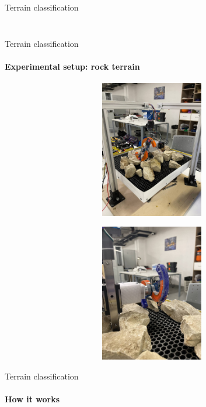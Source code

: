 \documentclass[aspectratio=169]{beamer}
\begin{document}
\begin{frame}[t]{Terrain classification}
\begin{columns}[T,onlytextwidth]
\begin{column}{0.49\textwidth}
\begin{figure}[H]
\begin{subfigure}{\textwidth}
                \end{subfigure}
            \end{figure}
        \end{column}
    \end{columns}
\end{frame}


\begin{frame}[t]{Terrain classification}
    \framesubtitle{Experimental setup: rock terrain}
    \vspace{-15pt}
    \begin{figure}[H]
        \begin{subfigure}{0.49\textwidth}
            \centering\includegraphics[height=6cm,width=1\textwidth,keepaspectratio]{s_shape_leg/view.jpg}
        \end{subfigure}
        \begin{subfigure}{0.49\textwidth}
            \centering\includegraphics[height=6cm,width=1\textwidth,keepaspectratio]{s_shape_leg/rocks.jpg}
        \end{subfigure}
    \end{figure}
\end{frame}

\begin{frame}[t]{Terrain classification}
    \framesubtitle{How it works}
    \
\end{frame}
\end{document}
